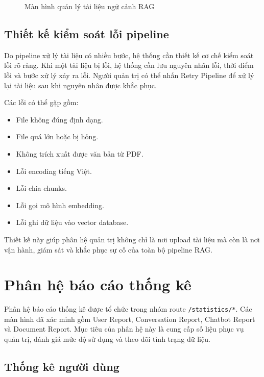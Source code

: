 \documentclass[12pt,a4paper]{report}
\begin{document}
\begin{figure}[H]
    \centering
    \caption{Màn hình quản lý tài liệu ngữ cảnh RAG}
    \label{fig:context-docs}
\end{figure}

\subsection{Thiết kế kiểm soát lỗi pipeline}

Do pipeline xử lý tài liệu có nhiều bước, hệ thống cần thiết kế cơ chế kiểm soát lỗi rõ ràng. Khi một tài liệu bị lỗi, hệ thống cần lưu nguyên nhân lỗi, thời điểm lỗi và bước xử lý xảy ra lỗi. Người quản trị có thể nhấn Retry Pipeline để xử lý lại tài liệu sau khi nguyên nhân được khắc phục.

Các lỗi có thể gặp gồm:

\begin{itemize}
    \item File không đúng định dạng.
    \item File quá lớn hoặc bị hỏng.
    \item Không trích xuất được văn bản từ PDF.
    \item Lỗi encoding tiếng Việt.
    \item Lỗi chia chunks.
    \item Lỗi gọi mô hình embedding.
    \item Lỗi ghi dữ liệu vào vector database.
\end{itemize}

Thiết kế này giúp phân hệ quản trị không chỉ là nơi upload tài liệu mà còn là nơi vận hành, giám sát và khắc phục sự cố của toàn bộ pipeline RAG.

\section{Phân hệ báo cáo thống kê}

Phân hệ báo cáo thống kê được tổ chức trong nhóm route \texttt{/statistics/*}. Các màn hình đã xác minh gồm User Report, Conversation Report, Chatbot Report và Document Report. Mục tiêu của phân hệ này là cung cấp số liệu phục vụ quản trị, đánh giá mức độ sử dụng và theo dõi tình trạng dữ liệu.

\subsection{Thống kê người dùng}
\end{document}
